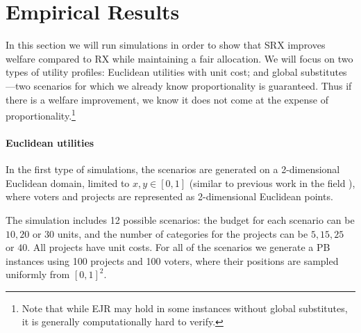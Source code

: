 \documentclass[runningheads]{llncs}
\begin{document}


    \section{Empirical Results}\label{sec:exp}
In this section we will run simulations in order to show that SRX improves welfare compared to RX while maintaining a fair allocation. We will focus on two types of utility profiles: Euclidean utilities with unit cost; and global substitutes---two scenarios for which we already know proportionality is guaranteed. Thus if there is a welfare improvement, we know it does not come at the expense of proportionality.\footnote{Note that while EJR may hold in some instances without global substitutes, it is generally computationally hard to verify.}



\paragraph{Euclidean utilities}
In the first type of simulations, the scenarios are generated on a 2-dimensional Euclidean domain, limited to $x,y\in [0,1]$ (similar to previous work in the field \cite{talmon2019framework, skowron2020participatory}), where voters and projects are represented as 2-dimensional Euclidean points.
 
 The simulation includes  12 possible scenarios: the budget  for each scenario can be $10, 20$ or $30$ units, and the number of  categories for the projects can be  $5,15,25$ or $40$. 
  All projects have unit costs. For all of the scenarios we generate a PB instances using 100 projects and 100 voters, where their positions  are sampled uniformly from $[0,1]^2$.
\end{document}
